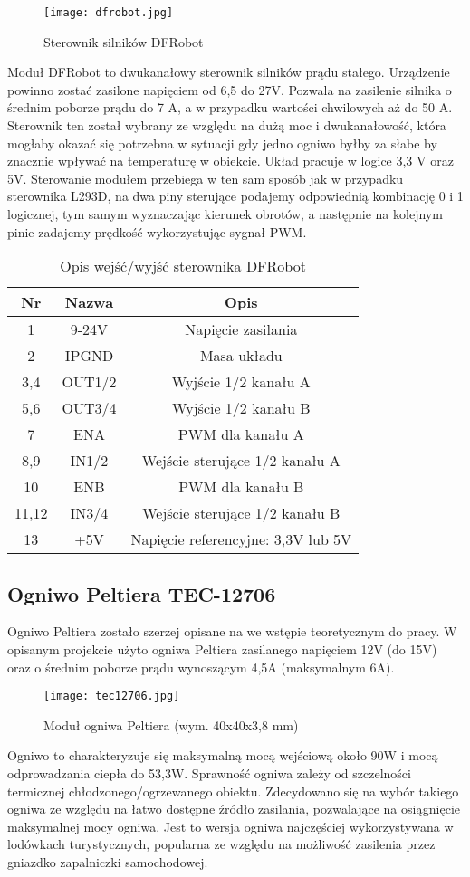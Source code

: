 \begin{figure}[H]
	\centering
	\texttt{[image: dfrobot.jpg]}
	\caption{Sterownik silników DFRobot}
\end{figure}
Moduł DFRobot to dwukanałowy sterownik silników prądu stałego. Urządzenie powinno zostać zasilone napięciem od 6,5 do 27V. Pozwala na zasilenie silnika o średnim poborze prądu do 7 A, a w przypadku wartości chwilowych aż do 50 A. Sterownik ten został wybrany ze względu na dużą moc i dwukanałowość, która mogłaby okazać się potrzebna w sytuacji gdy jedno ogniwo byłby za słabe by znacznie wpływać na temperaturę w obiekcie. Układ pracuje w logice 3,3 V oraz 5V. Sterowanie modułem przebiega w ten sam sposób jak w przypadku sterownika L293D, na dwa piny sterujące podajemy odpowiednią kombinację 0 i 1 logicznej, tym samym wyznaczając kierunek obrotów, a następnie na kolejnym pinie zadajemy prędkość wykorzystując sygnał PWM.
\begin{table}[H]
	\centering
	\caption{Opis wejść/wyjść sterownika DFRobot}
	\begin{tabular}{|c|c|c|}
		
  \hline 
  \bfseries Nr & \bfseries Nazwa & \bfseries Opis \\
  \hline
    1&9-24V&Napięcie zasilania \\
  \hline
     2&IPGND&Masa układu  \\
  \hline
  3,4&OUT1/2&Wyjście 1/2 kanału A  \\
  \hline
           5,6&OUT3/4&Wyjście 1/2 kanału B  \\
  \hline
    7&ENA&PWM dla kanału A \\
  \hline
       8,9&IN1/2&Wejście sterujące 1/2 kanału A  \\
  \hline
  10&ENB&PWM dla kanału B  \\
  \hline
       11,12&IN3/4&Wejście sterujące 1/2 kanału B  \\
  \hline
           13&+5V&Napięcie referencyjne: 3,3V lub 5V  \\
  \hline
\end{tabular}
\end{table}
\subsection{Ogniwo Peltiera TEC-12706}%
Ogniwo Peltiera zostało szerzej opisane na we wstępie teoretycznym do pracy. W opisanym projekcie użyto ogniwa Peltiera zasilanego napięciem 12V (do 15V) oraz o średnim poborze prądu wynoszącym 4,5A (maksymalnym 6A).
\begin{figure}[H]
	\centering
	\texttt{[image: tec12706.jpg]}
	\caption{Moduł ogniwa Peltiera (wym. 40x40x3,8 mm)}
\end{figure}
Ogniwo to charakteryzuje się maksymalną mocą wejściową około 90W i mocą odprowadzania ciepła do 53,3W. Sprawność ogniwa zależy od szczelności termicznej chłodzonego/ogrzewanego obiektu. Zdecydowano się na wybór takiego ogniwa ze względu na łatwo dostępne źródło zasilania, pozwalające na osiągnięcie maksymalnej mocy ogniwa. Jest to wersja ogniwa najczęściej wykorzystywana w lodówkach turystycznych, popularna ze względu na możliwość zasilenia przez gniazdko zapalniczki samochodowej.


